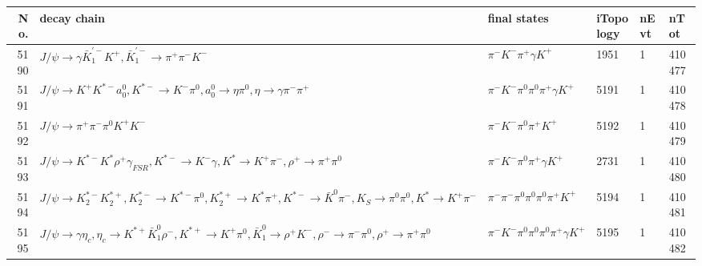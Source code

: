 \begin{table}[htbp] 
\begin{center}
\begin{small}
\begin{tabular}{rlllll}\hline\hline
 No. & decay chain & final states &  iTopology & nEvt & nTot \\\hline
5190&$J/\psi       \rightarrow \gamma       \bar{K}_1^{'-}K^{+}          , \bar{K}_1^{'-} \rightarrow \pi^{+}        \pi^{-}        K^{-}          $&$\pi^{-}        K^{-}          \pi^{+}        \gamma       K^{+}          $& 1951&    1&410477\\
5191&$J/\psi       \rightarrow K^{+}          K^{*-}         a_{0}^{0}      , K^{*-}          \rightarrow K^{-}          \pi^{0}        , a_{0}^{0}       \rightarrow \eta          \pi^{0}        , \eta           \rightarrow \gamma       \pi^{-}        \pi^{+}        $&$\pi^{-}        K^{-}          \pi^{0}        \pi^{0}        \pi^{+}        \gamma       K^{+}          $& 5191&    1&410478\\
5192&$J/\psi       \rightarrow \pi^{+}        \pi^{-}        \pi^{0}        K^{+}          K^{-}          $&$\pi^{-}        K^{-}          \pi^{0}        \pi^{+}        K^{+}          $& 5192&    1&410479\\
5193&$J/\psi       \rightarrow K^{*-}         K^{*}          \rho^{+}      \gamma_{FSR} , K^{*-}          \rightarrow K^{-}          \gamma       , K^{*}           \rightarrow K^{+}          \pi^{-}        , \rho^{+}       \rightarrow \pi^{+}        \pi^{0}        $&$\pi^{-}        K^{-}          \pi^{0}        \pi^{+}        \gamma       K^{+}          $& 2731&    1&410480\\
5194&$J/\psi       \rightarrow K_2^{*-}       K_2^{*+}       , K_2^{*-}        \rightarrow K^{*-}         \pi^{0}        , K_2^{*+}        \rightarrow K^{*}          \pi^{+}        , K^{*-}          \rightarrow \bar{K}^{0}   \pi^{-}        , K_{S}           \rightarrow \pi^{0}        \pi^{0}        , K^{*}           \rightarrow K^{+}          \pi^{-}        $&$\pi^{-}        \pi^{-}        \pi^{0}        \pi^{0}        \pi^{0}        \pi^{+}        K^{+}          $& 5194&    1&410481\\
5195&$J/\psi       \rightarrow \gamma       \eta_{c}    , \eta_{c}     \rightarrow K^{*+}         \bar{K}_1^{0} \rho^{-}      , K^{*+}          \rightarrow K^{+}          \pi^{0}        , \bar{K}_1^{0}  \rightarrow \rho^{+}      K^{-}          , \rho^{-}       \rightarrow \pi^{-}        \pi^{0}        , \rho^{+}       \rightarrow \pi^{+}        \pi^{0}        $&$\pi^{-}        K^{-}          \pi^{0}        \pi^{0}        \pi^{0}        \pi^{+}        \gamma       K^{+}          $& 5195&    1&410482\\

\end{tabular}
\end{small}
\end{center}
\end{table}
